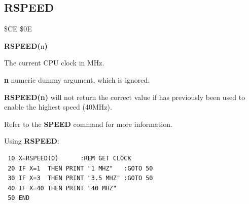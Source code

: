 \subsection{RSPEED}
\begin{description}[leftmargin=2cm,style=nextline]
\item [Token:] \$CE \$0E
\item [Format:] {\bf RSPEED(}n{\bf)}
\item [Returns:]  The current CPU clock in MHz.

                {\bf n} numeric dummy argument, which is ignored.

\item [Remarks:] {\bf RSPEED(n)} will not return the correct value if 
                 has previously been used to enable the highest speed (40MHz).

                 Refer to the {\bf SPEED} command for more information.

\item [Example:] Using {\bf RSPEED}:
\begin{tcolorbox}[colback=black,coltext=white]
\verbatimfont{\codefont}
\begin{verbatim}
 10 X=RSPEED(0)      :REM GET CLOCK
 20 IF X=1  THEN PRINT "1 MHZ"   :GOTO 50
 30 IF X=3  THEN PRINT "3.5 MHZ" :GOTO 50
 40 IF X=40 THEN PRINT "40 MHZ"
 50 END
\end{verbatim}
\end{tcolorbox}
\end{description}


\newpage
